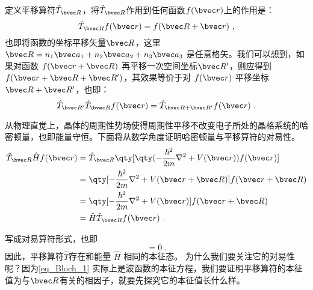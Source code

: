 定义平移算符$\hat{T}_{\bvec R}$，将$\hat{T}_{\bvec R}$作用到任何函数$f(\bvec r)$上的作用是：
\begin{equation}
\hat{T}_{\bvec R} f(\bvec r) = f(\bvec R + \bvec r)~,
\end{equation}
也即将函数的坐标平移矢量$\bvec R$，这里$\bvec R = n_1 \bvec a_1 + n_2 \bvec a_2 + n_3 \bvec a_3 $ 是任意格矢。我们可以想到，如果对函数 $f(\bvec r + \bvec R)$ 再平移一次空间坐标$\bvec R'$，则应得到$f(\bvec r + \bvec R + \bvec R')$，其效果等价于对 $f(\bvec r)$ 平移坐标$\bvec R + \bvec R'$，也即：
\begin{equation}
\hat{T}_{\bvec R'}\hat{T}_{\bvec R} f(\bvec r) = \hat{T}_{\bvec R + \bvec R'}f(\bvec r )~.
\end{equation}

从物理直觉上，晶体的周期性势场使得周期性平移不改变电子所处的晶格系统的哈密顿量，也即能量守恒。下面将从数学角度证明哈密顿量与平移算符的对易性。
\begin{equation}
\begin{aligned}
\hat{T}_{\bvec R} \hat{H} f(\bvec r) &= \hat{T}_{\bvec R} \qty[\qty(-\frac{\hbar^2}{2m}\nabla^2+V(\bvec r) ) f(\bvec r)] \\
&= \qty[-\frac{\hbar^2}{2m}\nabla^2+V(\bvec r + \bvec R)]  f(\bvec r + \bvec R)\\
&= \qty[-\frac{\hbar^2}{2m}\nabla^2+V(\bvec r) ] f(\bvec r+ \bvec R)\\
& = \hat{H} \hat{T}_{\bvec R} f(\bvec r)~.
\end{aligned}
\end{equation}

写成对易算符形式，也即
\begin{equation}
[\hat{T},\hat{H}] = 0~.
\end{equation}
因此，平移算符$\hat{T}$存在和能量 $\hat{H}$ 相同的本征态。
为什么我们要关注它的对易性呢？因为\autoref{eq_Bloch_1} 实际上是波函数的本征方程，我们要证明平移算符的本征值为与$\bvec R$有关的相因子，就要先探究它的本征值长什么样。

